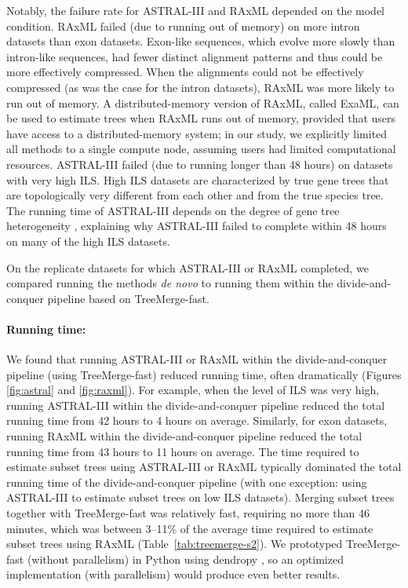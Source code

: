 Notably, the failure rate for ASTRAL-III and RAxML depended on the model condition.
RAxML failed (due to running out of memory) on more intron datasets than exon datasets.
Exon-like sequences, which evolve more slowly than intron-like sequences, had fewer distinct alignment patterns and thus could be more effectively compressed.
When the alignments could not be effectively compressed (as was the case for the intron datasets), RAxML was more likely to run out of memory.
A distributed-memory version of RAxML, called \gls{ExaML}, can be used to estimate trees when RAxML runs out of memory, provided that users have access to a distributed-memory system; in our study, we explicitly limited all methods to a single compute node, assuming users had limited computational resources.
ASTRAL-III failed (due to running longer than 48 hours) on datasets with very high ILS.
High ILS datasets are characterized by true gene trees that are topologically very different from each other and from the true species tree. 
The running time of ASTRAL-III depends on the degree of gene tree heterogeneity \cite{zhang2018astral3}, explaining why ASTRAL-III failed to complete within 48 hours on many of the high ILS datasets.

On the replicate datasets for which ASTRAL-III or RAxML completed, we compared running the methods {\em de novo} to running them within the divide-and-conquer pipeline based on TreeMerge-fast.

\paragraph{Running time:}
We found that running ASTRAL-III or RAxML within the divide-and-conquer pipeline (using TreeMerge-fast) reduced running time, often dramatically (Figures \ref{fig:astral} and \ref{fig:raxml}).
For example, when the level of ILS was very high, running ASTRAL-III within the divide-and-conquer pipeline reduced the total running time from 42 hours to 4 hours on average.
Similarly, for exon datasets, running RAxML within the divide-and-conquer pipeline reduced the total running time from 43 hours to 11 hours on average.
The time required to estimate subset trees using ASTRAL-III or RAxML typically dominated the total running time of the divide-and-conquer pipeline (with one exception: using ASTRAL-III to estimate subset trees on low ILS datasets).
Merging subset trees together with TreeMerge-fast was relatively fast, requiring no more than 46 minutes, which was between 3--11\% of the average time required to estimate subset trees using RAxML (Table~\ref{tab:treemerge-s2}).
We prototyped TreeMerge-fast (without parallelism) in Python using dendropy \cite{sukumaran2010dendropy}, so an optimized implementation (with parallelism) would produce even better results.

